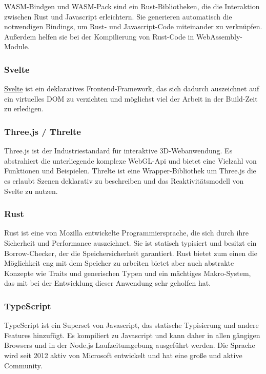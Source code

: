 \documentclass[ngerman]{article}
\begin{document}
WASM-Bindgen und WASM-Pack sind ein Rust-Bibliotheken, die die Interaktion zwischen Rust und Javascript erleichtern. Sie generieren automatisch die notwendigen Bindings, um Rust- und Javascript-Code miteinander zu verknüpfen. Außerdem helfen sie bei der Kompilierung von Rust-Code in WebAssembly-Module. 
\cite{rustwasmIntroductionwasmbindgen}

\subsubsection{Svelte}
\label{sec:Svelte}

\href{https://svelte.dev/}{Svelte} ist ein deklaratives Frontend-Framework, das sich dadurch auszeichnet auf ein virtuelles DOM zu verzichten und möglichst viel der Arbeit in der Build-Zeit zu erledigen.

\subsubsection{Three.js / Threlte}

Three.js ist der Industriestandard für interaktive 3D-Webanwendung. Es abstrahiert die unterliegende komplexe WebGL-Api und bietet eine Vielzahl von Funktionen und Beispielen. Threlte ist eine Wrapper-Bibliothek um Three.js die es erlaubt Szenen deklarativ zu beschreiben und das Reaktivitätsmodell von Svelte zu nutzen.

\subsubsection{Rust}
\label{sec:Rust}

Rust ist eine von Mozilla entwickelte Programmiersprache, die sich durch ihre Sicherheit und Performance auszeichnet. Sie ist statisch typisiert und besitzt ein Borrow-Checker, der die Speichersicherheit garantiert. \cite{Jung_2020} Rust bietet zum einen die Möglichkeit eng mit dem Speicher zu arbeiten bietet aber auch abstrakte Konzepte wie Traits und generischen Typen und ein mächtiges Makro-System, das mit bei der Entwicklung dieser Anwendung sehr geholfen hat.

\subsubsection{TypeScript}
\label{sec:TypeScript}
TypeScript ist ein Superset von Javascript, das statische Typisierung und andere Features hinzufügt. Es kompiliert zu Javascript und kann daher in allen gängigen Browsers und in der Node.js Laufzeitumgebung ausgeführt werden. Die Sprache wird seit 2012 aktiv von Microsoft entwickelt und hat eine große und aktive Community.
\end{document}
